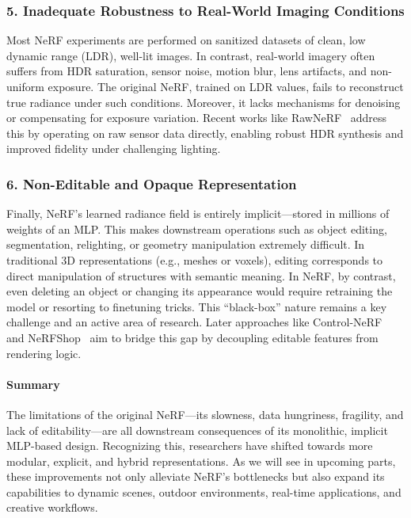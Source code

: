 \subsubsection*{5. Inadequate Robustness to Real-World Imaging Conditions}

Most NeRF experiments are performed on sanitized datasets of clean, low dynamic range (LDR), well-lit images. In contrast, real-world imagery often suffers from HDR saturation, sensor noise, motion blur, lens artifacts, and non-uniform exposure. The original NeRF, trained on LDR values, fails to reconstruct true radiance under such conditions. Moreover, it lacks mechanisms for denoising or compensating for exposure variation. Recent works like RawNeRF~\cite{mildenhall2022_rawnerf} address this by operating on raw sensor data directly, enabling robust HDR synthesis and improved fidelity under challenging lighting.

\subsubsection*{6. Non-Editable and Opaque Representation}

Finally, NeRF’s learned radiance field is entirely implicit—stored in millions of weights of an MLP. This makes downstream operations such as object editing, segmentation, relighting, or geometry manipulation extremely difficult. In traditional 3D representations (e.g., meshes or voxels), editing corresponds to direct manipulation of structures with semantic meaning. In NeRF, by contrast, even deleting an object or changing its appearance would require retraining the model or resorting to finetuning tricks. This ``black-box'' nature remains a key challenge and an active area of research. Later approaches like Control-NeRF~\cite{lazova2023_controlnerf} and NeRFShop~\cite{jang2023_nerfshop} aim to bridge this gap by decoupling editable features from rendering logic.

\paragraph{Summary}

The limitations of the original NeRF—its slowness, data hungriness, fragility, and lack of editability—are all downstream consequences of its monolithic, implicit MLP-based design. Recognizing this, researchers have shifted towards more modular, explicit, and hybrid representations. As we will see in upcoming parts, these improvements not only alleviate NeRF’s bottlenecks but also expand its capabilities to dynamic scenes, outdoor environments, real-time applications, and creative workflows.

